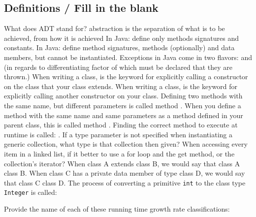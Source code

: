 \documentclass[11pt]{exam}
\begin{document}
\begin{questions}

\section*{Definitions / Fill in the blank}

\question[2] What does ADT stand for? \makebox[2in]{\hrulefill}
\question[2] \makebox[2in]{\hrulefill} abstraction is the separation of what is to be achieved, from how it is achieved
\question[2] In Java: \makebox[2in]{\hrulefill} define only methods signatures and constants.
\question[2] In Java: \makebox[2in]{\hrulefill} define method signatures, methods (optionally) and data members, but cannot be instantiated.
\question[2] Exceptions in Java come in two flavors: \makebox[2in]{\hrulefill} and \makebox[2in]{\hrulefill} (in regards to differentiating factor of which must be declared that they are thrown.)
\question[2] When writing a class, \makebox[2in]{\hrulefill} is the keyword for explicitly calling a constructor on the class that your class extends.
\question[2] When writing a class, \makebox[2in]{\hrulefill} is the keyword for explicitly calling another constructor on your class.
\question[2] Defining two methods with the same name, but different parameters is called method \makebox[2in]{\hrulefill}.
\question[2] When you define a method with the same name and same parameters as a method defined in your parent class, this is called method \makebox[2in]{\hrulefill}.
\question[2] Finding the correct method to execute at runtime is called: \makebox[2in]{\hrulefill}.
\question[2] If a type parameter is not specified when instantiating a generic collection, what type is that collection then given? \makebox[2in]{\hrulefill}
\question[2] When accessing every item in a linked list, if it better to use a for loop and the get method, or the collection's iterator? \makebox[2in]{\hrulefill}
\question[2] When class A extends class B, we would say that class A \makebox[2in]{\hrulefill} class B.
\question[2] When class C has a private data member of type class D, we would say that class C \makebox[2in]{\hrulefill} class D.
\question[2] The process of converting a primitive {\tt int} to the class type {\tt Integer} is called: \makebox[2in]{\hrulefill}

\newpage
\question Provide the name of each of these running time growth rate classifications:
\end{questions}
\end{document}
